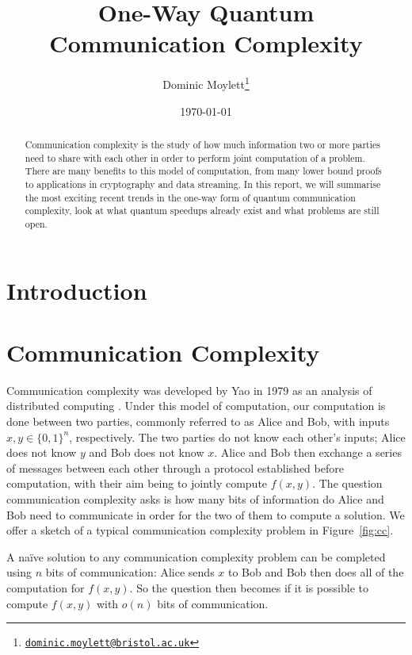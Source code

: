 \documentclass[a4paper]{article}
\begin{document}
    \title{One-Way Quantum Communication Complexity}
    \author{Dominic Moylett\thanks{\texttt{\href{dominic.moylett@bristol.ac.uk}{dominic.moylett@bristol.ac.uk}}}}
    \date{\today}
    \maketitle

    \begin{abstract}
        Communication complexity is the study of how much information two or more parties need to share with each other in order to perform joint computation of a problem. There are many benefits to this model of computation, from many lower bound proofs to applications in cryptography and data streaming. In this report, we will summarise the most exciting recent trends in the one-way form of quantum communication complexity, look at what quantum speedups already exist and what problems are still open.
    \end{abstract}

    \section{Introduction}

    \section{Communication Complexity}

        Communication complexity was developed by Yao in 1979 as an analysis of distributed computing \cite{Yao:1979:CQR:800135.804414}. Under this model of computation, our computation is done between two parties, commonly referred to as Alice and Bob, with inputs $x, y \in \{0, 1\}^n$, respectively. The two parties do not know each other's inputs; Alice does not know $y$ and Bob does not know $x$. Alice and Bob then exchange a series of messages between each other through a protocol established before computation, with their aim being to jointly compute $f(x, y)$. The question communication complexity asks is how many bits of information do Alice and Bob need to communicate in order for the two of them to compute a solution. We offer a sketch of a typical communication complexity problem in Figure~\ref{fig:cc}.

        A na\"{i}ve solution to any communication complexity problem can be completed using $n$ bits of communication: Alice sends $x$ to Bob and Bob then does all of the computation for $f(x, y)$. So the question then becomes if it is possible to compute $f(x, y)$ with $o(n)$ bits of communication.
\end{document}
